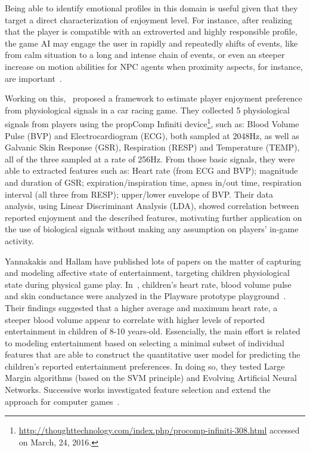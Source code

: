 Being able to identify emotional profiles in this domain is useful given that they target a direct characterization of enjoyment level. For instance, after realizing that the player is compatible with an extroverted and highly responsible profile, the game AI may engage the user in rapidly and repeatedly shifts of events, like from calm situation to a long and intense chain of events, or even an steeper increase on motion abilities for NPC agents when proximity aspects, for instance, are important~\cite{bakkes_player_2012}.

Working on this,~\cite{tognetti_modeling_2010} proposed a framework to estimate player enjoyment preference from physiological signals in a car racing game. They collected 5 physiological signals from players using the propComp Infiniti device\footnote{\url{http://thoughttechnology.com/index.php/procomp-infiniti-308.html} accessed on March, 24, 2016.}, such as: Blood Volume Pulse (BVP) and Electrocardiogram (ECG), both sampled at 2048Hz, as well as Galvanic Skin Response (GSR), Respiration (RESP) and Temperature (TEMP), all of the three sampled at a rate of 256Hz. From those basic signals, they were able to extracted features such as: Heart rate (from ECG and BVP); magnitude and duration of GSR; expiration/inspiration time, apnea in/out time, respiration interval (all three from RESP); upper/lower envelope of BVP. Their data analysis, using Linear Discriminant Analysis (LDA), showed correlation between reported enjoyment and the described features, motivating further application on the use of biological signals without making any assumption on players' in-game activity.

Yannakakis and Hallam have published lots of papers on the matter of capturing and modeling affective state of entertainment, targeting children physiological state during physical game play. In~\cite{yannakakis_modeling_2006,yannakakis_entertainment_2008}, children's heart rate, blood volume pulse and skin conductance were analyzed in the Playware prototype playground~\cite{lund_playware_2005}. Their findings suggested that a higher average and maximum heart rate, a steeper blood volume appear to correlate with higher levels of reported entertainment in children of 8-10 years-old. Essencially, the main effort is related to modeling entertainment based on selecting a minimal subset of individual features that are able to construct the quantitative user model for predicting the children's reported entertainment preferences. In doing so, they tested Large Margin algorithms (based on the SVM principle) and Evolving Artificial Neural Networks. Successive works investigated feature selection and extend the approach for computer games~\cite{yannakakis_towards_2006,yannakakis_entertainment_2007,yannakakis_feature_2007,yannakakis_entertainment_2008B}. 

